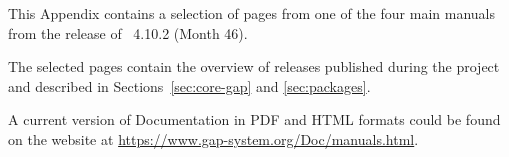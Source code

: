 \documentclass{deliverablereport}
\begin{document}
This Appendix contains a selection of pages from
one of the four main \GAP manuals
from the release of \GAP~4.10.2 (Month 46).

The selected pages contain the overview of \GAP releases published
during the project and described in Sections~\ref{sec:core-gap} and \ref{sec:packages}.

A current version of \GAP Documentation in PDF and HTML formats
could be found on the \GAP website at \url{https://www.gap-system.org/Doc/manuals.html}.

%



\clearpage
\printbibliography
\end{document}
